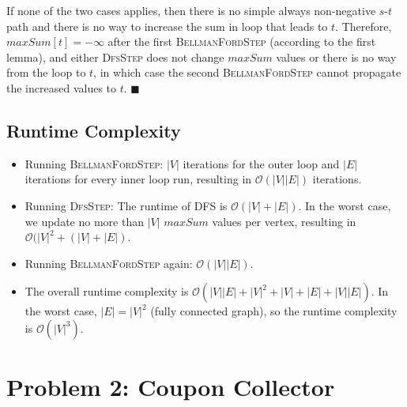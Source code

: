 \documentclass[12pt]{article}
\begin{document}
If none of the two cases applies, then there is no simple always non-negative $s$-$t$ path and there is no way to increase the sum in loop that leads to $t$. Therefore, $\mathit{maxSum}[t] = -\infty$ after the first \textsc{BellmanFordStep} (according to the first lemma), and either \textsc{DfsStep} does not change $\mathit{maxSum}$ values or there is no way from the loop to $t$, in which case the second \textsc{BellmanFordStep} cannot propagate the increased values to $t$. \hfill $\blacksquare$

\subsection*{Runtime Complexity}
\begin{itemize}
	\item Running \textsc{BellmanFordStep}: $|V|$ iterations for the outer loop and $|E|$ iterations for every inner loop run, resulting in $\mathcal{O}(|V| |E|)$ iterations.
	\item Running \textsc{DfsStep}: The runtime of DFS is $\mathcal{O}(|V| + |E|)$. In the worst case, we update no more than $|V|$ $\mathit{maxSum}$ values per vertex, resulting in $\mathcal{O}(|V|^2 + (|V| + |E|)$.
	\item Running \textsc{BellmanFordStep} again: $\mathcal{O}(|V| |E|)$.
	\item The overall runtime complexity is $\mathcal{O}(|V| |E| + |V|^2 + |V| + |E| + |V| |E|)$. In the worst case, $|E| = |V|^2$ (fully connected graph), so the runtime complexity is $\mathcal{O}(|V|^3)$.
\end{itemize}
 
\newpage
\section*{Problem 2: Coupon Collector}
\end{document}

